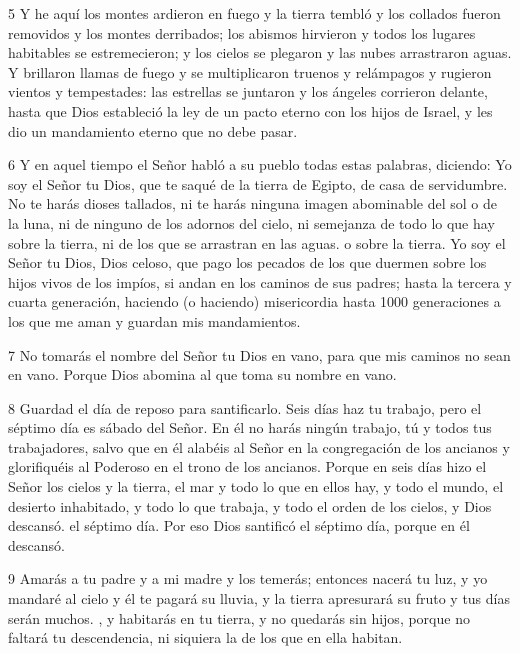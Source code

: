 \par 5 Y he aquí los montes ardieron en fuego y la tierra tembló y los collados fueron removidos y los montes derribados; los abismos hirvieron y todos los lugares habitables se estremecieron; y los cielos se plegaron y las nubes arrastraron aguas. Y brillaron llamas de fuego y se multiplicaron truenos y relámpagos y rugieron vientos y tempestades: las estrellas se juntaron y los ángeles corrieron delante, hasta que Dios estableció la ley de un pacto eterno con los hijos de Israel, y les dio un mandamiento eterno que no debe pasar.

\par 6 Y en aquel tiempo el Señor habló a su pueblo todas estas palabras, diciendo: Yo soy el Señor tu Dios, que te saqué de la tierra de Egipto, de casa de servidumbre. No te harás dioses tallados, ni te harás ninguna imagen abominable del sol o de la luna, ni de ninguno de los adornos del cielo, ni semejanza de todo lo que hay sobre la tierra, ni de los que se arrastran en las aguas. o sobre la tierra. Yo soy el Señor tu Dios, Dios celoso, que pago los pecados de los que duermen sobre los hijos vivos de los impíos, si andan en los caminos de sus padres; hasta la tercera y cuarta generación, haciendo (o haciendo) misericordia hasta 1000 generaciones a los que me aman y guardan mis mandamientos.

\par 7 No tomarás el nombre del Señor tu Dios en vano, para que mis caminos no sean en vano. Porque Dios abomina al que toma su nombre en vano.

\par 8 Guardad el día de reposo para santificarlo. Seis días haz tu trabajo, pero el séptimo día es sábado del Señor. En él no harás ningún trabajo, tú y todos tus trabajadores, salvo que en él alabéis al Señor en la congregación de los ancianos y glorifiquéis al Poderoso en el trono de los ancianos. Porque en seis días hizo el Señor los cielos y la tierra, el mar y todo lo que en ellos hay, y todo el mundo, el desierto inhabitado, y todo lo que trabaja, y todo el orden de los cielos, y Dios descansó. el séptimo día. Por eso Dios santificó el séptimo día, porque en él descansó.

\par 9 Amarás a tu padre y a mi madre y los temerás; entonces nacerá tu luz, y yo mandaré al cielo y él te pagará su lluvia, y la tierra apresurará su fruto y tus días serán muchos. , y habitarás en tu tierra, y no quedarás sin hijos, porque no faltará tu descendencia, ni siquiera la de los que en ella habitan.

